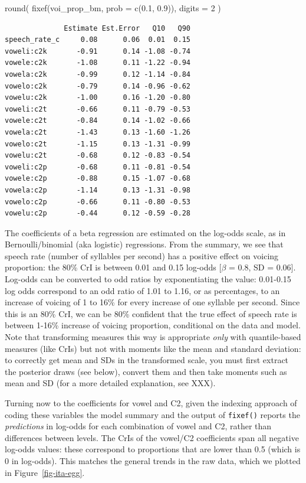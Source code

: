 \documentclass[
  authoryear,
  preprint,
  3p]{elsarticle}
\newenvironment{Shaded}{\begin{snugshade}}{\end{snugshade}}
\newcommand{\AttributeTok}[1]{\textcolor[rgb]{0.40,0.45,0.13}{#1}}
\newcommand{\DecValTok}[1]{\textcolor[rgb]{0.68,0.00,0.00}{#1}}
\newcommand{\FloatTok}[1]{\textcolor[rgb]{0.68,0.00,0.00}{#1}}
\newcommand{\FunctionTok}[1]{\textcolor[rgb]{0.28,0.35,0.67}{#1}}
\newcommand{\NormalTok}[1]{\textcolor[rgb]{0.00,0.23,0.31}{#1}}
\begin{document}
\begin{Shaded}
\begin{Highlighting}[]
\FunctionTok{round}\NormalTok{(}
  \FunctionTok{fixef}\NormalTok{(voi\_prop\_bm, }\AttributeTok{prob =} \FunctionTok{c}\NormalTok{(}\FloatTok{0.1}\NormalTok{, }\FloatTok{0.9}\NormalTok{)),}
  \AttributeTok{digits =} \DecValTok{2}
\NormalTok{)}
\end{Highlighting}
\end{Shaded}

\begin{verbatim}
              Estimate Est.Error   Q10   Q90
speech_rate_c     0.08      0.06  0.01  0.15
voweli:c2k       -0.91      0.14 -1.08 -0.74
vowele:c2k       -1.08      0.11 -1.22 -0.94
vowela:c2k       -0.99      0.12 -1.14 -0.84
vowelo:c2k       -0.79      0.14 -0.96 -0.62
vowelu:c2k       -1.00      0.16 -1.20 -0.80
voweli:c2t       -0.66      0.11 -0.79 -0.53
vowele:c2t       -0.84      0.14 -1.02 -0.66
vowela:c2t       -1.43      0.13 -1.60 -1.26
vowelo:c2t       -1.15      0.13 -1.31 -0.99
vowelu:c2t       -0.68      0.12 -0.83 -0.54
voweli:c2p       -0.68      0.11 -0.81 -0.54
vowele:c2p       -0.88      0.15 -1.07 -0.68
vowela:c2p       -1.14      0.13 -1.31 -0.98
vowelo:c2p       -0.66      0.11 -0.80 -0.53
vowelu:c2p       -0.44      0.12 -0.59 -0.28
\end{verbatim}

The coefficients of a beta regression are estimated on the log-odds
scale, as in Bernoulli/binomial (aka logistic) regressions. From the
summary, we see that speech rate (number of syllables per second) has a
positive effect on voicing proportion: the 80\% CrI is between 0.01 and
0.15 log-odds {[}\(\beta\) = 0.8, SD = 0.06{]}. Log-odds can be
converted to odd ratios by exponentiating the value: 0.01-0.15 log odds
correspond to an odd ratio of 1.01 to 1.16, or as percentages, to an
increase of voicing of 1 to 16\% for every increase of one syllable per
second. Since this is an 80\% CrI, we can be 80\% confident that the
true effect of speech rate is between 1-16\% increase of voicing
proportion, conditional on the data and model. Note that transforming
measures this way is appropriate \emph{only} with quantile-based
measures (like CrIs) but not with moments like the mean and standard
deviation: to correctly get mean and SDs in the transformed scale, you
must first extract the posterior draws (see below), convert them and
then take moments such as mean and SD (for a more detailed explanation,
see XXX).

Turning now to the coefficients for vowel and C2, given the indexing
approach of coding these variables the model summary and the output of
\texttt{fixef()} reports the \emph{predictions} in log-odds for each
combination of vowel and C2, rather than differences between levels. The
CrIs of the vowel/C2 coefficients span all negative log-odds values:
these correspond to proportions that are lower than 0.5 (which is 0 in
log-odds). This matches the general trends in the raw data, which we
plotted in Figure~\ref{fig-ita-egg}.
\end{document}

